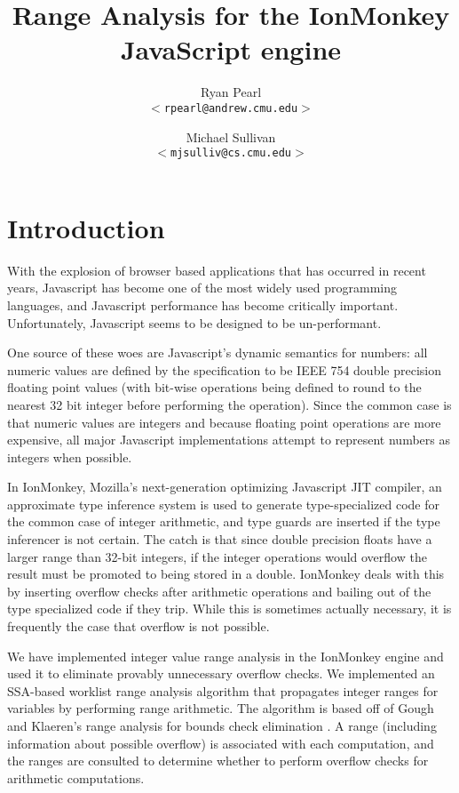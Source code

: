 \documentclass{article}
\begin{document}
\title{\bf Range Analysis for the IonMonkey JavaScript engine}

\author{
Ryan Pearl\\
\texttt{$<$rpearl@andrew.cmu.edu$>$}\\
\and
Michael Sullivan\\
\texttt{$<$mjsulliv@cs.cmu.edu$>$}\\
}

\maketitle

\section{Introduction}
With the explosion of browser based applications that has occurred in
recent years, Javascript has become one of the most widely used
programming languages, and Javascript performance has become
critically important. Unfortunately, Javascript seems to be designed
to be un-performant.

One source of these woes are Javascript's dynamic semantics for
numbers: all numeric values are defined by the specification to be
IEEE 754 double precision floating point values (with bit-wise
operations being defined to round to the nearest 32 bit integer before
performing the operation). Since the common case is that numeric
values are integers and because floating point operations are
more expensive, all major Javascript implementations attempt to
represent numbers as integers when possible.

In IonMonkey, Mozilla's next-generation optimizing Javascript JIT
compiler, an approximate type inference system is used to generate
type-specialized code for the common case of integer arithmetic, and
type guards are inserted if the type inferencer is not certain. The
catch is that since double precision floats have a larger range than
32-bit integers, if the integer operations would overflow the result
must be promoted to being stored in a double. IonMonkey deals with
this by inserting overflow checks after arithmetic operations and
bailing out of the type specialized code if they trip. While this is
sometimes actually necessary, it is frequently the case that overflow
is not possible.

We have implemented integer value range analysis in the IonMonkey
engine and used it to eliminate provably unnecessary overflow checks.
We implemented an SSA-based worklist range analysis algorithm that
propagates integer ranges for variables by performing range
arithmetic. The algorithm is based off of Gough and Klaeren's range
analysis for bounds check elimination
\cite{Gough94eliminatingrange}. A range (including information about
possible overflow) is associated with each computation, and the ranges
are consulted to determine whether to perform overflow checks for
arithmetic computations.
\end{document}
